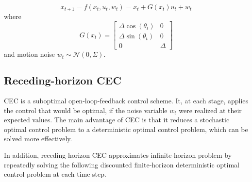 \documentclass[conference]{IEEEtran}
\begin{document}
\[
{x}_{t+1} = {f}({x}_t, {u}_t, {w}_t) = {x}_t + {G}({x}_t) {u}_t + {w}_t
\]
where
\[
{G}({x}_t) = \begin{bmatrix}
\Delta \cos(\theta_t) & 0 \\
\Delta \sin(\theta_t) & 0 \\
0 & \Delta 
\end{bmatrix}
\]
and motion noise \( {w}_t \sim \mathcal{N}(0, \Sigma) \).

\subsection{Receding-horizon CEC}
CEC is a suboptimal open-loop-feedback control scheme.
It, at each stage, applies the control that would be optimal,
if the noise variable $w_t$ were realized at their expected values. 
The main advantage of CEC is that it reduces 
a stochastic optimal control problem to a deterministic optimal control problem, 
which can be solved more effectively. 

In addition,
receding-horizon CEC approximates infinite-horizon problem 
by repeatedly solving the following discounted finite-horizon
deterministic optimal control problem at each time step.
\end{document}

